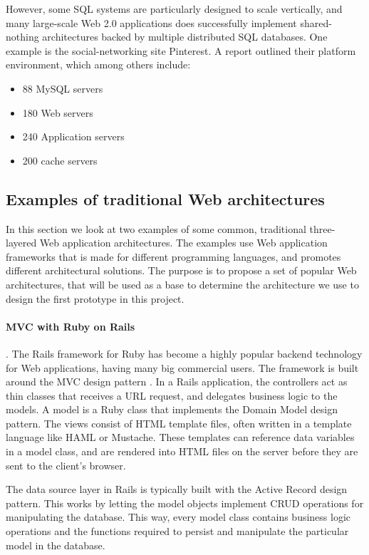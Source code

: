 However, some SQL systems are particularly designed to scale vertically\cite{sqlscale}, and many large-scale Web 2.0 applications does successfully implement shared-nothing architectures backed by multiple distributed SQL databases. One example is the social-networking site Pinterest\cite{pinterest}. A report\cite{scalepint} outlined their platform environment, which among others include:
\begin{itemize}
\item{} 88 MySQL servers
\item{} 180 Web servers
\item{} 240 Application servers
\item{} 200 cache servers
\end{itemize}
				
\subsection{Examples of traditional Web architectures}
In this section we look at two examples of some common, traditional three-layered Web application architectures. The examples use Web application frameworks that is made for different programming languages, and promotes different architectural solutions. The purpose is to propose a set of popular Web architectures, that will be used as a base to determine the architecture we use to design the first prototype in this project. 
				
\paragraph{MVC with Ruby on Rails}. The Rails framework for Ruby has become a highly popular backend technology for Web applications, having many big commercial users. The framework is built around the MVC design pattern \cite{mvc}. In a Rails application, the controllers act as thin classes that receives a URL request, and  delegates business logic to the models. A model is a Ruby class that implements the Domain Model design pattern. The views consist of HTML template files, often written in a template language like HAML\cite{haml} or Mustache\cite{mustache}. These templates can reference data variables in a model class, and are rendered into HTML files on the server before they are sent to the client's browser. 

The data source layer in Rails is typically built with the Active Record design pattern. This works by letting the model objects implement CRUD operations for manipulating the database. This way, every model class contains business logic operations and the functions required to persist and manipulate the particular model in the database.

